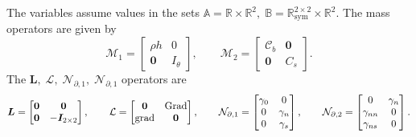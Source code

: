 The variables assume values in the sets $\mathbb{A} = \mathbb{R} \times \mathbb{R}^2, \; \mathbb{B} =\mathbb{R}^{2\times 2}_{\text{sym}} \times \mathbb{R}^2$. The mass operators are given by 
\begin{equation}
\mathcal{M}_1 = \begin{bmatrix}
\rho h & 0 \\
\bm{0} & I_\theta
\end{bmatrix}, \qquad 
\mathcal{M}_2 = \begin{bmatrix}
\bm{\mathcal{C}}_b & \bm{0} \\
\bm{0} & C_s
\end{bmatrix}.
\end{equation} 
The $\bm{L}, \; \mathcal{L}, \; \mathcal{N}_{\partial, 1}, \; \mathcal{N}_{\partial, 1}$ operators are 
\begin{equation}
\bm{L} = \begin{bmatrix}
\bm{0}  & \bm{0}  \\
\bm{0} & -\bm{I}_{2 \times 2} \\
\end{bmatrix}, \qquad
\mathcal{L} = \begin{bmatrix}
\bm{0} & \operatorname*{Grad}\\
\operatorname*{grad} & \bm{0}\\
\end{bmatrix}, \qquad
\mathcal{N}_{\partial, 1} = \begin{bmatrix}
\gamma_0 & 0 \\ 
0 & \gamma_n \\
0 & \gamma_s \\
\end{bmatrix}, \qquad 
\mathcal{N}_{\partial, 2} = \begin{bmatrix}
0 & \gamma_{n}  \\
\gamma_{nn} & 0 \\
\gamma_{ns} & 0\\
\end{bmatrix}.
\end{equation}


